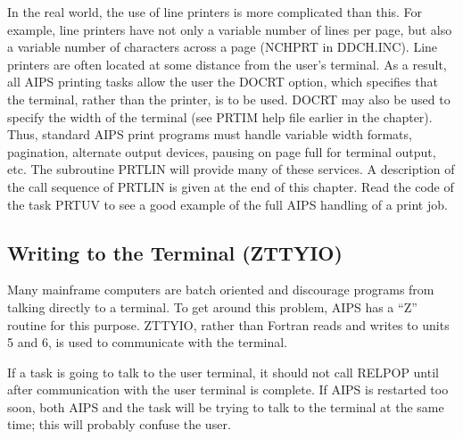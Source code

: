In the real world, the use of line printers is more complicated than
this.  For example, line printers have not only a variable number of
lines per page, but also a variable number of characters across a page
(NCHPRT in DDCH.INC).  Line printers are often located at
some distance from the user's terminal.  As a result, all AIPS
printing tasks allow the user the DOCRT option, which specifies that
the terminal, rather than the printer, is to be used.  DOCRT may also
be used to specify the width of the terminal (see PRTIM help file
earlier in the chapter).  Thus, standard AIPS print programs must
handle variable width formats, pagination, alternate output devices,
pausing on page full for terminal output, etc.  The subroutine PRTLIN
will provide many of these services.  A description of the call
sequence of PRTLIN is given at the end of this chapter.  Read the code
of the task PRTUV to see a good example of the full AIPS handling of a
print job.

\subsection{Writing to the Terminal (ZTTYIO)}
 Many mainframe computers are batch oriented and discourage programs
from talking directly to a terminal.  To get around this problem, AIPS
has a ``Z'' routine for this purpose.  ZTTYIO, rather than Fortran reads
and writes to units 5 and 6, is used to communicate with the terminal.

If a task is going to talk to the user terminal, it should not call
RELPOP until after communication with the user terminal is complete.
If AIPS is restarted too soon, both AIPS and the task will be trying
to talk to the terminal at the same time; this will probably confuse
the user.

